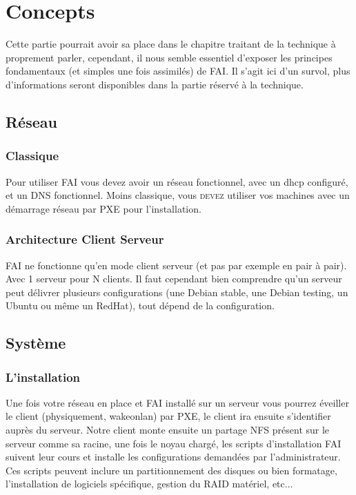\documentclass[a4paper,12pt,one side,titlepage]{report}
\begin{document}
\section{Concepts}
Cette partie pourrait avoir sa place dans le chapitre traitant de la technique à proprement parler, cependant, il nous semble essentiel d'exposer les principes fondamentaux (et simples une fois assimilés) de \textsc{FAI}. Il s'agit ici d'un survol, plus d'informations seront disponibles dans la partie réservé à la technique.


\subsection{Réseau}

\subsubsection{Classique}
Pour utiliser \textsc{FAI} vous devez avoir un réseau fonctionnel, avec un dhcp configuré, et un DNS fonctionnel. Moins classique, vous \textsc{devez} utiliser vos machines avec un démarrage réseau par PXE pour l'installation.

\subsubsection{Architecture Client Serveur}
\textsc{FAI} ne fonctionne qu'en mode client serveur (et pas par exemple en pair à pair). Avec 1 serveur pour N clients. Il faut cependant bien comprendre qu'un serveur peut délivrer plusieurs configurations (une Debian stable, une Debian testing, un Ubuntu ou même un RedHat), tout dépend de la configuration.

\subsection{Système}

\subsubsection{L'installation}
Une fois votre réseau en place et \textsc{FAI} installé sur un serveur vous pourrez éveiller le client (physiquement, wakeonlan) par PXE, le client ira ensuite s'identifier auprès du serveur. Notre client monte ensuite un partage NFS présent sur le serveur comme sa racine, une fois le noyau chargé, les scripts  d'installation FAI suivent leur cours et installe les configurations demandées par l'administrateur. Ces scripts peuvent inclure un partitionnement des disques ou bien formatage, l'installation de logiciels spécifique, gestion du RAID matériel, etc...
\end{document}

